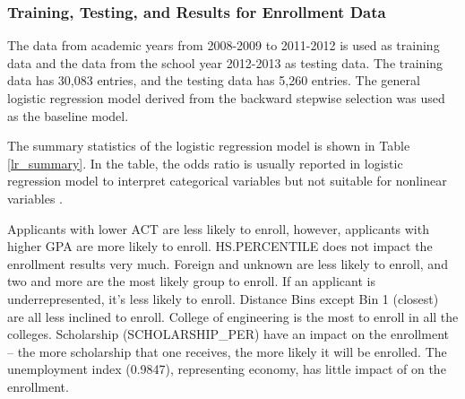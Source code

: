 \documentclass[12pt,english]{report}
\begin{document}
\begin{table}
\end{table}


\subsubsection{Training, Testing, and Results for Enrollment Data}
The data from academic years from 2008-2009 to 2011-2012 is used as training
data  and the 
data from the school year 2012-2013 as testing data. The training data has
30,083 entries, 
and the testing data has 5,260 entries. The general logistic regression model
derived from 
the backward stepwise selection was used as the baseline model.


The summary statistics of the logistic regression model is shown in Table 
\ref{lr_summary}.  In the table, the odds ratio is usually reported in logistic
regression 
model to interpret categorical variables but not suitable for nonlinear
variables 
\citep{DesJardins2006, long2006regression}. 


Applicants with lower ACT are less likely to enroll, however, applicants with
higher GPA are 
more likely to enroll. HS.PERCENTILE does not impact the enrollment results
very much. 
Foreign and unknown are less likely to enroll, and two and more are the most
likely group to 
enroll. If an applicant is underrepresented, it's less likely to enroll.
Distance Bins 
except Bin 1 (closest) are all less inclined to enroll. College of engineering
is the most 
to enroll in all the colleges. Scholarship (SCHOLARSHIP\_PER) have an impact on
the 
enrollment -- the more scholarship that one receives, the more likely it will
be enrolled. 
The unemployment index (0.9847), representing economy, has little impact of on
the 
enrollment.
\end{document}
